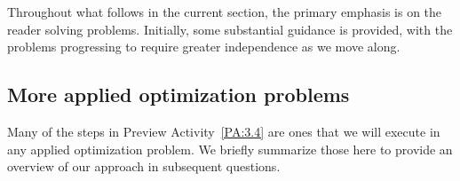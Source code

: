 Throughout what follows in the current section, the primary emphasis is on the reader solving problems.  Initially, some substantial guidance is provided, with the problems progressing to require greater independence as we move along. \newpage

\vspace*{-.5cm}


\subsection*{More applied optimization problems}

Many of the steps in Preview Activity~\ref{PA:3.4} are ones that we will execute in any applied optimization problem.  We briefly summarize those here to provide an overview of our approach in subsequent questions.

